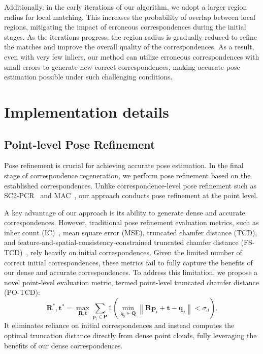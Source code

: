 Additionally, in the early iterations of our algorithm, we adopt a larger region radius for local matching.  This increases the probability of overlap between local regions, mitigating the impact of erroneous correspondences during the initial stages.  As the iterations progress, the region radius is gradually reduced to refine the matches and improve the overall quality of the correspondences.
As a result, even with very few inliers, our method can utilize erroneous correspondences with small errors to generate new correct correspondences, making accurate pose estimation possible under such challenging conditions.


\section{Implementation details}


\subsection{Point-level Pose Refinement}
Pose refinement is crucial for achieving accurate pose estimation. In the final stage of correspondence regeneration, we perform pose refinement based on the established correspondences. Unlike correspondence-level pose refinement such as SC2-PCR~\cite{chen2022sc2} and MAC~\cite{zhang20233d}, our approach conducts pose refinement at the point level.

A key advantage of our approach is its ability to generate dense and accurate correspondences. However, traditional pose refinement evaluation metrics, such as inlier count (IC)~\cite{chen2022sc2}, mean square error (MSE), truncated chamfer distance (TCD), and feature-and-spatial-consistency-constrained truncated chamfer distance (FS-TCD)~\cite{chen2023sc2}, rely heavily on initial correspondences. Given the limited number of correct initial correspondences, these metrics fail to fully capture the benefits of our dense and accurate correspondences. To address this limitation, we propose a novel point-level evaluation metric, termed point-level truncated chamfer distance (PO-TCD):
\begin{equation}
    { \mathbf{R}}^{*}, { \mathbf{t}}^{*}=\max _{\mathbf{R}, \mathbf{t}} 
    \sum_{\mathbf{{p}}_i \in \mathbf{{P}}} 
    \mathds {1}\left(
        \min _{\mathbf{{q}}_j \in \mathbf{{Q}}}
        \left\|  \mathbf{\mathbf{R} {p}}_i+\mathbf{t}-\mathbf{{q}}_j  \right\|< {\sigma_d}
        \right).
\end{equation}
It eliminates reliance on initial correspondences and instead computes the optimal truncation distance directly from dense point clouds, fully leveraging the benefits of our dense correspondences.


